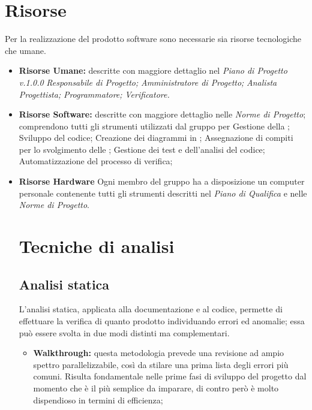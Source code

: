 \section{Risorse} Per la realizzazione del prodotto software sono necessarie sia risorse tecnologiche che umane.
\begin{itemize}
	\item \textbf{Risorse Umane:} descritte con maggiore dettaglio nel \textit{Piano di Progetto v.1.0.0}
	\subitem	\textit{Responsabile di Progetto;}
	\subitem	\textit{Amministratore di Progetto;}
	\subitem	\textit{Analista}
	\subitem	\textit{Progettista;}
	\subitem	\textit{Programmatore;}
	\subitem	\textit{Verificatore.}
	
	\item \textbf{Risorse Software:} descritte con maggiore dettaglio nelle \textit{Norme di Progetto}; comprendono tutti gli strumenti utilizzati dal gruppo per
	\subitem Gestione della ;
	\subitem Sviluppo del codice;
	\subitem Creazione dei diagrammi in ;
	\subitem Assegnazione di compiti per lo svolgimento delle ;
	\subitem Gestione dei test e dell'analisi del codice;
	\subitem Automatizzazione del processo di verifica;

	\item \textbf{Risorse Hardware}
	Ogni membro del gruppo ha a disposizione un computer personale contenente tutti gli strumenti descritti nel \textit{Piano di Qualifica} e nelle 
	\textit{Norme di Progetto}.
	
\section{Tecniche di analisi}
\subsection{Analisi statica}
L’analisi statica, applicata alla documentazione e al
codice, permette di effettuare la verifica di quanto prodotto individuando errori ed
anomalie; essa può essere svolta in due modi distinti ma complementari.

\begin{itemize}
\item \textbf{Walkthrough:} questa metodologia prevede una revisione ad ampio
spettro parallelizzabile, così da stilare una prima lista degli errori più
comuni. Risulta fondamentale nelle prime fasi di sviluppo del progetto
dal momento che è il più semplice da imparare, di contro però è molto
dispendioso in termini di efficienza;


\end{itemize}
\end{itemize}
